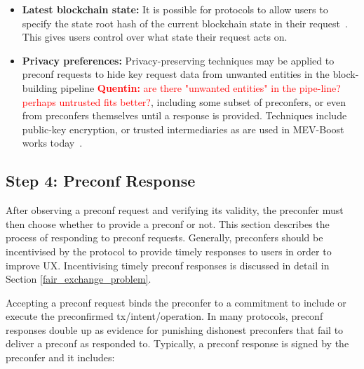 \documentclass[a4paper]{article}
\theoremstyle{boldstyle}
\newcommand{\cm}[1]{\textcolor{blue}{\textbf{Conor:} #1}}
\newcommand{\qb}[1]{\textcolor{red}{\textbf{Quentin:} #1}}
\begin{document}
\begin{itemize}
        \item \textbf{Latest blockchain state:} 
        It is possible for protocols to allow users to specify the state root hash of the current blockchain state in their request~\cite{W:AnalyzingBFTProposer-PromisedPreconfirmations}. This gives users control over what state their request acts on.
        
        \item \textbf{Privacy preferences:} 
        Privacy-preserving techniques may be applied to preconf requests to hide key request data from unwanted entities in the block-building pipeline \qb{are there "unwanted entities" in the pipe-line? perhaps untrusted fits better?}, including some subset of preconfers, or even from preconfers themselves until a response is provided. Techniques include public-key encryption, or trusted intermediaries as are used in MEV-Boost works today~\cite{W:BasedPreconfirmationswithMulti-roundMEV-Boost, W:AnalyzingBFTProposer-PromisedPreconfirmations, W:Documentation-BidStructure, W:Towardsanimplementationofbasedpreconfirmationsleveragingrestaking}.
         
    \end{itemize}
    
    
\subsection{Step 4: Preconf Response} \label{preconf_response}
        
    After observing a preconf request and verifying its validity, the preconfer must then choose whether to provide a preconf or not. This section describes the process of responding to preconf requests. Generally, preconfers should be incentivised by the protocol to provide timely responses to users in order to improve UX. Incentivising timely preconf responses is discussed in detail in Section \ref{fair_exchange_problem}. 
    
    
    Accepting a preconf request binds the preconfer to a commitment to include or execute the preconfirmed tx/intent/operation. In many protocols, preconf responses double up as evidence for punishing dishonest preconfers that fail to deliver a preconf as responded to. Typically, a preconf response is signed by the preconfer and it includes:
\end{document}
